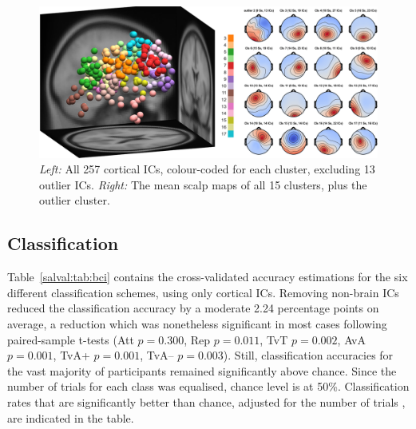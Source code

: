 \begin{figure}[htb]
    \centering
    \includegraphics[width=\textwidth]{figures/salval-clusters.png}
    \caption[Independent component dipoles and cluster scalp maps.]{\emph{Left:} All 257 cortical ICs, colour-coded for each cluster, excluding 13 outlier ICs. \emph{Right:} The mean scalp maps of all 15 clusters, plus the outlier cluster.}
    \label{salval:fig:clusters}
\end{figure}


\subsection{Classification}

Table~\ref{salval:tab:bci} contains the cross-validated accuracy estimations for the six different classification schemes, using only cortical ICs. Removing non-brain ICs reduced the classification accuracy by a moderate 2.24 percentage points on average, a reduction which was nonetheless significant in most cases following paired-sample t-tests (Att $p=0.300$, Rep $p=0.011$, TvT $p=0.002$, AvA $p=0.001$, TvA+ $p=0.001$, TvA-- $p=0.003$). Still, classification accuracies for the vast majority of participants remained significantly above chance. Since the number of trials for each class was equalised, chance level is at 50\%. Classification rates that are significantly better than chance, adjusted for the number of trials \cite{mullerputz2008random}, are indicated in the table.


